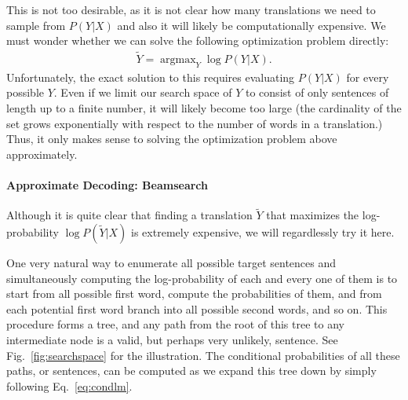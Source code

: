 \documentclass{report}
\DeclareMathOperator*{\argmax}{\arg \max}
\begin{document}
This is not too desirable, as it is not clear how many translations we need to
sample from $P(Y|X)$ and also it will likely be computationally expensive. We
must wonder whether we can solve the following optimization problem directly:
\begin{align*}
    \tilde{Y} = \argmax_{Y} \log P(Y|X).
\end{align*}
Unfortunately, the exact solution to this requires evaluating $P(Y|X)$ for every
possible $Y$. Even if we limit our search space of $Y$ to consist of only
sentences of length up to a finite number, it will likely become too large (the
cardinality of the set grows exponentially with respect to the number of words
in a translation.) Thus, it only makes sense to solving the optimization problem
above approximately.

\paragraph{Approximate Decoding: Beamsearch}

Although it is quite clear that finding a translation $\tilde{Y}$ that maximizes
the log-probability $\log P(\tilde{Y}|X)$ is extremely expensive, we will
regardlessly try it here. 

One very natural way to enumerate all possible target sentences and
simultaneously computing the log-probability of each and every one of them is to
start from all possible first word, compute the probabilities of them, and from
each potential first word branch into all possible second words, and so on. This
procedure forms a tree, and any path from the root of this tree to any
intermediate node is a valid, but perhaps very unlikely, sentence. See
Fig.~\ref{fig:searchspace} for the illustration.  The conditional probabilities
of all these paths, or sentences, can be computed as we expand this tree down by
simply following Eq.~\eqref{eq:condlm}.
\end{document}
